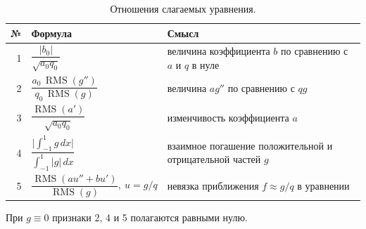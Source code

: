 \documentclass[14pt,a4paper]{extarticle}
\begin{document}
\begin{table}[!htbp]
\centering
\caption{Отношения слагаемых уравнения.}
\label{tab:app-extra}
\renewcommand{\arraystretch}{1.6}
\begin{tabular}{rl>{\raggedright\arraybackslash}p{}}
\toprule
№ & Формула & Смысл\\
\midrule
1 & $\dfrac{|b_0|}{\sqrt{a_0q_0}}$ & величина коэффициента $b$ по сравнению с $a$ и $q$ в нуле\\[10pt]
2 & $\dfrac{a_0\,\operatorname{RMS}(g'')}{q_0\,\operatorname{RMS}(g)}$ & величина $ag''$ по сравнению с $qg$\\[10pt]
3 & $\dfrac{\operatorname{RMS}(a')}{\sqrt{a_0q_0}}$ & изменчивость коэффициента $a$\\[10pt]
4 & $\dfrac{\bigl|\int_{-1}^{1}g\,dx\bigr|}{\int_{-1}^{1}|g|\,dx}$ & взаимное погашение положительной и отрицательной частей $g$\\[10pt]
5 & $\dfrac{\operatorname{RMS}(au''+bu')}{\operatorname{RMS}(g)},\ u=g/q$ & невязка приближения $f\approx g/q$ в уравнении\\
\bottomrule
\end{tabular}
\end{table}
При $g\equiv0$ признаки 2, 4 и 5 полагаются равными нулю.
\end{document}
